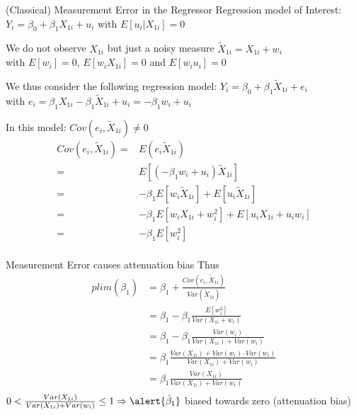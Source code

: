 \documentclass[11pt, aspectratio = 169]{beamer}
\begin{document}
\begin{frame}{(Classical) Measurement Error in the Regressor}
Regression model of Interest: $Y_i = \beta_0 + \beta_1 X_{1i} + u_i$   with $E[u_i | X_{1i}] = 0$
\vspace{+0.2cm}

We do not observe $X_{1i}$ but just a \color{teal}noisy measure $\widetilde{X}_{1i} = X_{1i} + w_i$ \\ \color{black}
with $E[w_i] = 0$, $E[w_iX_{1i}] = 0$ and $E[w_iu_i] = 0$
\vspace{+0.2cm}

We thus consider the following regression model: $Y_i = \beta_0 + \beta_1 \widetilde{X}_{1i} + e_i$ \\
with $e_i = \beta_1 X_{1i} - \beta_1 \widetilde{X}_{1i} + u_i = - \beta_1 w_{i} + u_i$
\vspace{+0.2cm}

\pause

In this model: $Cov(e_i, \widetilde{X}_{1i})\neq 0$ \small
\begin{align*}
Cov(e_i, \widetilde{X}_{1i}) = & E(e_i \widetilde{X}_{1i}) \\
= & E[(-\beta_1 w_{i} + u_i) \widetilde{X}_{1i}] \\
= &-\beta_1 E[w_i \widetilde{X}_{1i} ]+ E[u_i  \widetilde{X}_{1i}] \\
= &-\beta_1 E[w_i X_{1i} + w_i^2] + E[u_i  X_{1i} + u_i w_i] \\
= &-\beta_1 E[w_i^2] \\
\end{align*}
\end{frame}

\begin{frame}{Measurement Error causes attenuation bias}
Thus
\begin{align*}
plim(\hat{\beta_1})& = \beta_1 + \frac{ Cov(e_i, \widetilde{X}_{1i})}{Var(\widetilde{X}_{1i})} \\
& = \beta_1  -\beta_1\frac{ E[w_i^2] }{Var(X_{1i} + w_i)} \\
& = \beta_1  -\beta_1\frac{ Var(w_i) }{Var(X_{1i}) + Var(w_i)} \\
& = \beta_1 \frac{ Var(X_{1i}) + Var(w_i) – Var(w_i) }{Var(X_{1i}) + Var(w_i)} \\
& = \beta_1 \frac{ Var(X_{1i}) }{Var(X_{1i}) + Var(w_i)} \\
\end{align*}
$ 0 < \frac{ Var(X_{1i}) }{Var(X_{1i}) + Var(w_i)} \leq 1 \Rightarrow \alert{\hat{\beta}_1}$ \alert{biased towards zero (attenuation bias)}
\end{frame}
\end{document}
